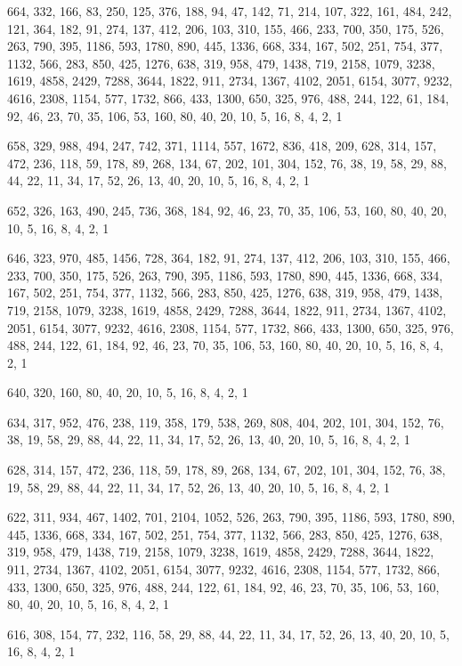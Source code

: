 \documentclass[12pt]{article}
\begin{document}
664, 332, 166, 83, 250, 125, 376, 188, 94, 47, 142, 71, 214, 107, 322, 161, 484, 242, 121, 364, 182, 91, 274, 137, 412, 206, 103, 310, 155, 466, 233, 700, 350, 175, 526, 263, 790, 395, 1186, 593, 1780, 890, 445, 1336, 668, 334, 167, 502, 251, 754, 377, 1132, 566, 283, 850, 425, 1276, 638, 319, 958, 479, 1438, 719, 2158, 1079, 3238, 1619, 4858, 2429, 7288, 3644, 1822, 911, 2734, 1367, 4102, 2051, 6154, 3077, 9232, 4616, 2308, 1154, 577, 1732, 866, 433, 1300, 650, 325, 976, 488, 244, 122, 61, 184, 92, 46, 23, 70, 35, 106, 53, 160, 80, 40, 20, 10, 5, 16, 8, 4, 2, 1

658, 329, 988, 494, 247, 742, 371, 1114, 557, 1672, 836, 418, 209, 628, 314, 157, 472, 236, 118, 59, 178, 89, 268, 134, 67, 202, 101, 304, 152, 76, 38, 19, 58, 29, 88, 44, 22, 11, 34, 17, 52, 26, 13, 40, 20, 10, 5, 16, 8, 4, 2, 1

652, 326, 163, 490, 245, 736, 368, 184, 92, 46, 23, 70, 35, 106, 53, 160, 80, 40, 20, 10, 5, 16, 8, 4, 2, 1

646, 323, 970, 485, 1456, 728, 364, 182, 91, 274, 137, 412, 206, 103, 310, 155, 466, 233, 700, 350, 175, 526, 263, 790, 395, 1186, 593, 1780, 890, 445, 1336, 668, 334, 167, 502, 251, 754, 377, 1132, 566, 283, 850, 425, 1276, 638, 319, 958, 479, 1438, 719, 2158, 1079, 3238, 1619, 4858, 2429, 7288, 3644, 1822, 911, 2734, 1367, 4102, 2051, 6154, 3077, 9232, 4616, 2308, 1154, 577, 1732, 866, 433, 1300, 650, 325, 976, 488, 244, 122, 61, 184, 92, 46, 23, 70, 35, 106, 53, 160, 80, 40, 20, 10, 5, 16, 8, 4, 2, 1

640, 320, 160, 80, 40, 20, 10, 5, 16, 8, 4, 2, 1

634, 317, 952, 476, 238, 119, 358, 179, 538, 269, 808, 404, 202, 101, 304, 152, 76, 38, 19, 58, 29, 88, 44, 22, 11, 34, 17, 52, 26, 13, 40, 20, 10, 5, 16, 8, 4, 2, 1

628, 314, 157, 472, 236, 118, 59, 178, 89, 268, 134, 67, 202, 101, 304, 152, 76, 38, 19, 58, 29, 88, 44, 22, 11, 34, 17, 52, 26, 13, 40, 20, 10, 5, 16, 8, 4, 2, 1

622, 311, 934, 467, 1402, 701, 2104, 1052, 526, 263, 790, 395, 1186, 593, 1780, 890, 445, 1336, 668, 334, 167, 502, 251, 754, 377, 1132, 566, 283, 850, 425, 1276, 638, 319, 958, 479, 1438, 719, 2158, 1079, 3238, 1619, 4858, 2429, 7288, 3644, 1822, 911, 2734, 1367, 4102, 2051, 6154, 3077, 9232, 4616, 2308, 1154, 577, 1732, 866, 433, 1300, 650, 325, 976, 488, 244, 122, 61, 184, 92, 46, 23, 70, 35, 106, 53, 160, 80, 40, 20, 10, 5, 16, 8, 4, 2, 1

616, 308, 154, 77, 232, 116, 58, 29, 88, 44, 22, 11, 34, 17, 52, 26, 13, 40, 20, 10, 5, 16, 8, 4, 2, 1
\end{document}
